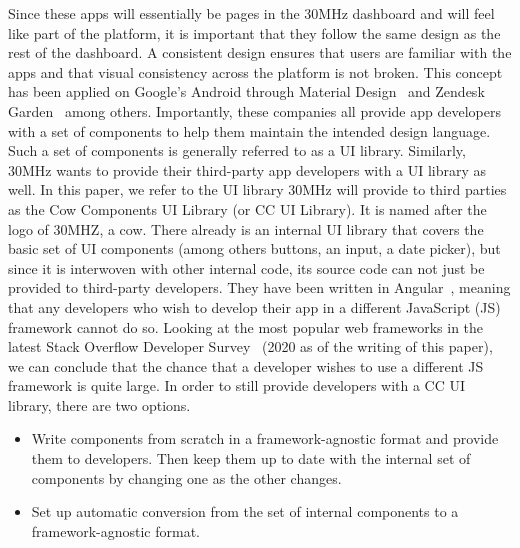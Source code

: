 Since these apps will essentially be pages in the 30MHz dashboard and will feel like part of the platform, it is important that they follow the same design as the rest of the dashboard. A consistent design ensures that users are familiar with the apps and that visual consistency across the platform is not broken. This concept has been applied on Google's Android through Material Design~ and Zendesk Garden~ among others. Importantly, these companies all provide app developers with a set of components to help them maintain the intended design language. Such a set of components is generally referred to as a UI library.
Similarly, 30MHz wants to provide their third-party app developers with a UI library as well. In this paper, we refer to the UI library 30MHz will provide to third parties as the Cow Components UI Library (or CC UI Library). It is named after the logo of 30MHZ, a cow. There already is an internal UI library that covers the basic set of UI components (among others buttons, an input, a date picker), but since it is interwoven with other internal code, its source code can not just be provided to third-party developers. They have been written in Angular~, meaning that any developers who wish to develop their app in a different JavaScript (JS) framework cannot do so. Looking at the most popular web frameworks in the latest Stack Overflow Developer Survey~ (2020 as of the writing of this paper), we can conclude that the chance that a developer wishes to use a different JS framework is quite large. In order to still provide developers with a CC UI library, there are two options.

\begin{itemize}
  \item Write components from scratch in a framework-agnostic format and provide them to developers. Then keep them up to date with the internal set of components by changing one as the other changes.
  \item Set up automatic conversion from the set of internal components to a framework-agnostic format.
\end{itemize}

